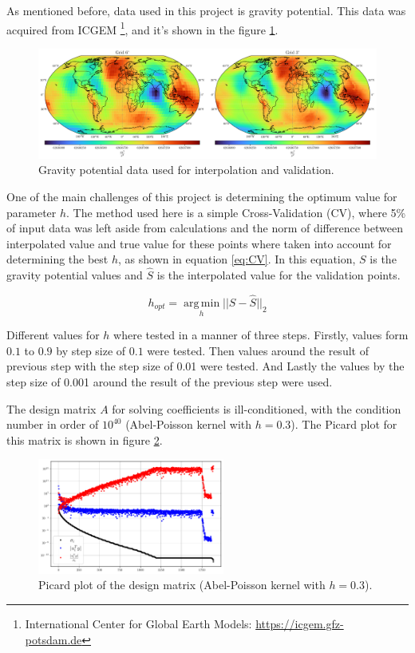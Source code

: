 \documentclass[12pt]{article}
\begin{document}
	As mentioned before, data used in this project is gravity potential. This data was acquired from ICGEM \footnote{International Center for Global Earth Models: \url{https://icgem.gfz-potsdam.de}}, and it's shown in the figure \ref{fig:MainData}.

	\begin{figure}[h!]
		\centering
		\includegraphics[width=16cm]{../Outputs/Plots/MainData.pdf}
		\caption{Gravity potential data used for interpolation and validation.}
		\label{fig:MainData}
	\end{figure}
	
	One of the main challenges of this project is determining the optimum value for parameter $h$. The method used here is a simple Cross-Validation (CV), where 5\% of input data was left aside from calculations and the norm of difference between interpolated value and true value for these points where taken into account for determining the best $h$, as shown in equation \ref{eq:CV}. In this equation, $S$ is the gravity potential values and $\hat{S}$ is the interpolated value for the validation points.
	
	\begin{equation}
		h_{opt} = \operatorname*{arg\,min}_{h} ||S-\hat{S}||_{2}
		\label{eq:CV}
	\end{equation}
	
	Different values for $h$ where tested in a manner of three steps. Firstly, values form $0.1$ to $0.9$ by step size of $0.1$ were tested. Then values around the result of previous step with the step size of 0.01 were tested. And Lastly the values by the step size of 0.001 around the result of the previous step were used. 
	
	The design matrix $A$ for solving coefficients is ill-conditioned, with the condition number in order of $10^{40}$ (Abel-Poisson kernel with $h=0.3$). The Picard plot for this matrix is shown in figure \ref{fig:PicardPlot}. 

	\begin{figure}[h!]
		\centering
		\includegraphics[height=3.8cm]{../Outputs/Plots/PicardPlot.pdf}
		\caption{Picard plot of the design matrix (Abel-Poisson kernel with $h=0.3$).}
		\label{fig:PicardPlot}
	\end{figure}
	
\end{document}
